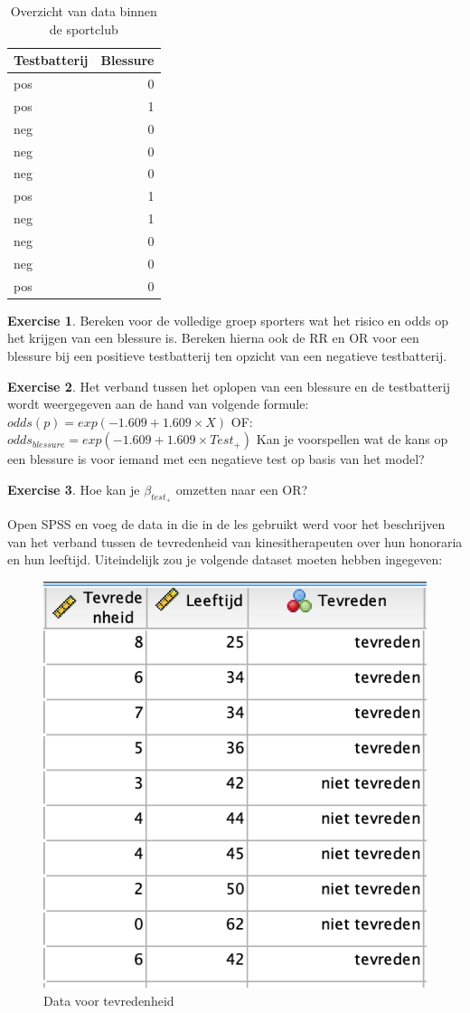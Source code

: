 \documentclass[
]{book}
\theoremstyle{definition}
\theoremstyle{definition}
\theoremstyle{definition}
\newtheorem{exercise}{Exercise}[chapter]
\theoremstyle{definition}
\theoremstyle{remark}
\begin{document}
\begin{table}

\caption{\label{tab:unnamed-chunk-23}Overzicht van data binnen de sportclub}
\centering
\begin{tabular}[t]{lr}
\toprule
Testbatterij & Blessure\\
\midrule
pos & 0\\
pos & 1\\
neg & 0\\
neg & 0\\
neg & 0\\
\addlinespace
pos & 1\\
neg & 1\\
neg & 0\\
neg & 0\\
pos & 0\\
\bottomrule
\end{tabular}
\end{table}

\begin{exercise}
Bereken voor de volledige groep sporters wat het risico en odds op het krijgen van een blessure is. Bereken hierna ook de RR en OR voor een blessure bij een positieve testbatterij ten opzicht van een negatieve testbatterij.
\end{exercise}

\begin{exercise}
Het verband tussen het oplopen van een blessure en de testbatterij wordt weergegeven aan de hand van volgende formule: \(odds(p) = exp(-1.609 + 1.609 \times X)\) OF: \(odds_{blessure} = exp(-1.609 + 1.609 \times Test_+)\) Kan je voorspellen wat de kans op een blessure is voor iemand met een negatieve test op basis van het model?
\end{exercise}

\begin{exercise}
Hoe kan je \(\beta_{test_+}\) omzetten naar een OR?
\end{exercise}

Open SPSS en voeg de data in die in de les gebruikt werd voor het beschrijven van het verband tussen de tevredenheid van kinesitherapeuten over hun honoraria en hun leeftijd. Uiteindelijk zou je volgende dataset moeten hebben ingegeven:

\begin{figure}
\includegraphics[width=0.5\linewidth]{img/ex_spss_log_1} \caption{Data voor tevredenheid}\label{fig:exspsslog1}
\end{figure}
\end{document}
